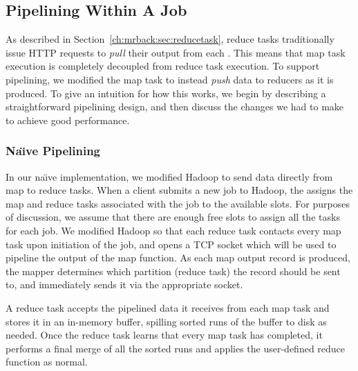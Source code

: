 
\subsection{Pipelining Within A Job}
\label{ch:hop:sec:intra-pipe}
As described in Section~\ref{ch:mrback:sec:reducetask}, reduce tasks
traditionally issue HTTP requests to \emph{pull} their output from
each {\TT}. This means that map task execution is completely decoupled
from reduce task execution. To support pipelining, we modified the map
task to instead \emph{push} data to reducers as it is produced. To
give an intuition for how this works, we begin by describing a
straightforward pipelining design, and then discuss the changes we
had to make to achieve good performance.

\subsubsection{Na\"{\i}ve Pipelining}
\label{ch:hop:sec:naive}
In our na\"{\i}ve implementation, we modified Hadoop to send data directly from
map to reduce tasks. When a client submits a new job to Hadoop, the {\JT}
assigns the map and reduce tasks associated with the job to the available {\TT}
slots. For purposes of discussion, we assume that there are enough free slots to
assign all the tasks for each job. We modified Hadoop so that each reduce task
contacts every map task upon initiation of the job, and opens a TCP socket which
will be used to pipeline the output of the map function. As each map output
record is produced, the mapper determines which partition (reduce task) the
record should be sent to, and immediately sends it via the appropriate socket.

A reduce task accepts the pipelined data it receives from each map task and
stores it in an in-memory buffer, spilling sorted runs of the buffer to disk as
needed. Once the reduce task learns that every map task has completed, it
performs a final merge of all the sorted runs and applies the user-defined
reduce function as normal.

